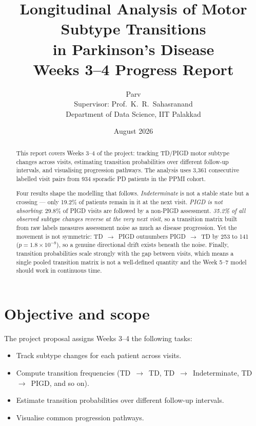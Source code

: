 \documentclass[11pt,a4paper]{article}
\title{\textbf{Longitudinal Analysis of Motor Subtype Transitions\\ in Parkinson's Disease}\\[0.6em]
       \large Weeks 3--4 Progress Report}
\author{Parv\\[0.3em]
        \small Supervisor: Prof.\ K.~R.\ Sahasranand\\
        \small Department of Data Science, IIT Palakkad}
\date{August 2026}
\newcommand{\arr}{$\rightarrow$}
\begin{document}
\maketitle

\begin{abstract}
\noindent
This report covers Weeks 3--4 of the project: tracking TD/PIGD motor subtype
changes across visits, estimating transition probabilities over different
follow-up intervals, and visualising progression pathways. The analysis uses
3{,}361 consecutive labelled visit pairs from 934 sporadic PD patients in the
PPMI cohort.

Four results shape the modelling that follows. \emph{Indeterminate} is not a
stable state but a crossing --- only 19.2\% of patients remain in it at the
next visit. \emph{PIGD is not absorbing}: 29.8\% of PIGD visits are followed by
a non-PIGD assessment. \emph{35.2\% of all observed subtype changes reverse at
the very next visit}, so a transition matrix built from raw labels measures
assessment noise as much as disease progression. Yet the movement is not
symmetric: TD~\arr~PIGD outnumbers PIGD~\arr~TD by 253 to 141
($p = 1.8\times10^{-8}$), so a genuine directional drift exists beneath the
noise. Finally, transition probabilities scale strongly with the gap between
visits, which means a single pooled transition matrix is not a well-defined
quantity and the Week 5--7 model should work in continuous time.
\end{abstract}

\vspace{0.4em}

\section{Objective and scope}

The project proposal assigns Weeks 3--4 the following tasks:

\begin{itemize}
  \item Track subtype changes for each patient across visits.
  \item Compute transition frequencies (TD~\arr~TD, TD~\arr~Indeterminate,
        TD~\arr~PIGD, and so on).
  \item Estimate transition probabilities over different follow-up intervals.
  \item Visualise common progression pathways.
\end{itemize}
\end{document}
